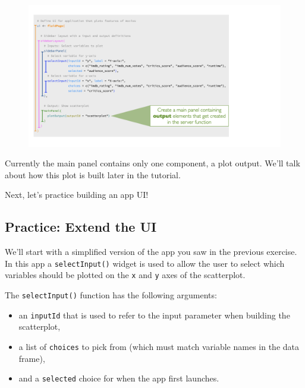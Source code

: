 \documentclass[
  letterpaper,
  DIV=11,
  numbers=noendperiod]{scrreprt}
\providecommand{\tightlist}{%
  \setlength{\itemsep}{0pt}\setlength{\parskip}{0pt}}
\begin{document}
\begin{figure}

{\centering \includegraphics[width=1\textwidth,height=\textheight]{./images/main-panel.png}

}

\end{figure}

Currently the main panel contains only one component, a plot output.
We'll talk about how this plot is built later in the tutorial.

Next, let's practice building an app UI!

\hypertarget{practice-extend-the-ui-1}{%
\subsection{Practice: Extend the UI}\label{practice-extend-the-ui-1}}

We'll start with a simplified version of the app you saw in the previous
exercise. In this app a \texttt{selectInput()} widget is used to allow
the user to select which variables should be plotted on the \texttt{x}
and \texttt{y} axes of the scatterplot.

The \texttt{selectInput()} function has the following arguments:

\begin{itemize}
\tightlist
\item
  an \texttt{inputId} that is used to refer to the input parameter when
  building the scatterplot,
\item
  a list of \texttt{choices} to pick from (which must match variable
  names in the data frame),
\item
  and a \texttt{selected} choice for when the app first launches.
\end{itemize}
\end{document}
